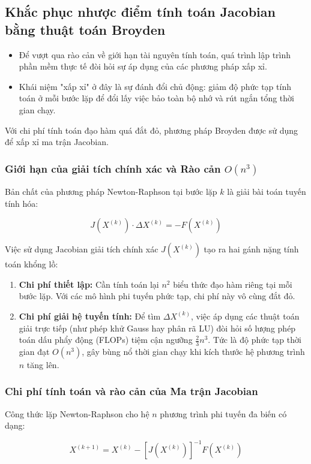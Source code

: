 \subsection{Khắc phục nhược điểm tính toán Jacobian bằng thuật toán Broyden}
\begin{itemize}
    \item Để vượt qua rào cản về giới hạn tài nguyên tính toán, quá trình lập trình phần mềm thực tế đòi hỏi sự áp dụng của các phương pháp xấp xỉ. 
    \item Khái niệm "xấp xỉ" ở đây là sự đánh đổi  chủ động: giảm độ phức tạp tính toán ở mỗi bước lặp để đổi lấy việc bảo toàn bộ nhớ và rút ngắn tổng thời gian chạy.
\end{itemize}
Với chi phí tính toán đạo hàm quá đắt đỏ, phương pháp Broyden được sử dụng để xấp xỉ ma trận Jacobian.
\subsubsection{ Giới hạn của giải tích chính xác và Rào cản $O(n^3)$}
Bản chất của phương pháp Newton-Raphson tại bước lặp $k$ là giải bài toán tuyến tính hóa:

\[
J(X^{(k)}) \cdot \Delta X^{(k)} = -F(X^{(k)})
\]

Việc sử dụng Jacobian giải tích chính xác $J(X^{(k)})$ tạo ra hai gánh nặng tính toán khổng lồ:

\begin{enumerate}
    \item \textbf{Chi phí thiết lập:} Cần tính toán lại $n^2$ biểu thức đạo hàm riêng tại mỗi bước lặp. Với các mô hình phi tuyến phức tạp, chi phí này vô cùng đắt đỏ.
    \item \textbf{Chi phí giải hệ tuyến tính:} Để tìm $\Delta X^{(k)}$, việc áp dụng các thuật toán giải trực tiếp (như phép khử Gauss hay phân rã LU) đòi hỏi số lượng phép toán dấu phẩy động (FLOPs) tiệm cận ngưỡng $\frac{2}{3}n^3$. Tức là độ phức tạp thời gian đạt $O(n^3)$, gây bùng nổ thời gian chạy khi kích thước hệ phương trình $n$ tăng lên.
\end{enumerate}




\subsubsection{Chi phí tính toán và rào cản của Ma trận Jacobian}
   Công thức lặp Newton-Raphson cho hệ $n$ phương trình phi tuyến đa biến có dạng:

$$X^{(k+1)} = X^{(k)} - [J(X^{(k)})]^{-1} F(X^{(k)})$$

